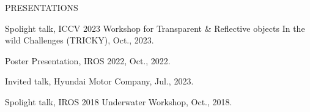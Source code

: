 \begin{rSection}{PRESENTATIONS}{}{}{}        
    \begin{rSubsection}{}{}{}{}    
        \item Spolight talk, ICCV 2023 Workshop for Transparent \& Reflective objects In the wild Challenges (TRICKY), Oct., 2023.
        \item Poster Presentation, IROS 2022, Oct., 2022.
        \item Invited talk, Hyundai Motor Company, Jul., 2023.
        \item Spolight talk, IROS 2018 Underwater Workshop, Oct., 2018.
     \end{rSubsection}         
 \end{rSection}

